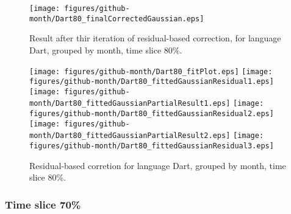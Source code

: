 \begin{figure}[]
\centering
{\texttt{[image: figures/github-month/Dart80\_finalCorrectedGaussian.eps]}}
\caption{Result after thir iteration of residual-based correction, for language Dart, grouped by month, time slice 80\%.}
\end{figure}


\begin{figure}[hb]
\centering
{}
{\texttt{[image: figures/github-month/Dart80\_fitPlot.eps]}}
{\texttt{[image: figures/github-month/Dart80\_fittedGaussianResidual1.eps]}}
{\texttt{[image: figures/github-month/Dart80\_fittedGaussianPartialResult1.eps]}}
{\texttt{[image: figures/github-month/Dart80\_fittedGaussianResidual2.eps]}}
{\texttt{[image: figures/github-month/Dart80\_fittedGaussianPartialResult2.eps]}}
{\texttt{[image: figures/github-month/Dart80\_fittedGaussianResidual3.eps]}}
\caption{Residual-based corretion for language Dart, grouped by month, time slice 80\%.}
\end{figure}


\clearpage 
\newpage 


\FloatBarrier

\subsubsection{Time slice 70\%}

